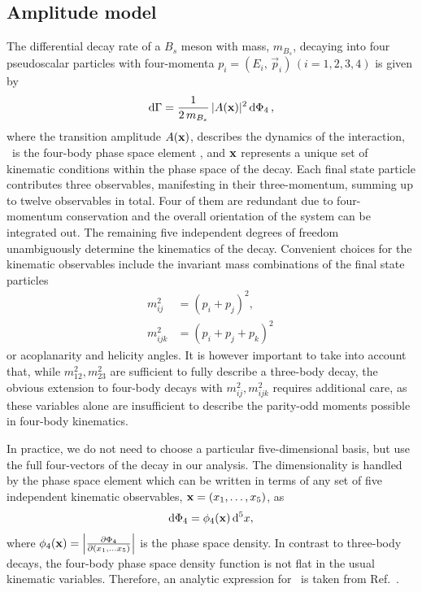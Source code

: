 \clearpage
\subsection{Amplitude model}

The differential decay rate of a $B_s$ meson 
with mass, $m_{B_s}$,
decaying into four pseudoscalar particles with four-momenta $p_{i}= (E_{i},\, \vec p_{i}) \, (i=1,2,3,4)$
is given by
\begin{equation}
	\text{d}\Gamma = \frac{1}{2 \, m_{B_s}} \,  \vert A(\mathbf{x}) \vert^{2} \, \mathrm{d}\Phi_4   \, ,
	\label{eq:decayRate}
\end{equation}
where the transition amplitude $A(\mathbf{x})$, describes the dynamics of the interaction, 
\dphs\ is the four-body phase space element \cite{Peskin}, and 
$\mathbf{x}$ 
represents a unique set of kinematic conditions within the phase space of the decay.
Each final state particle contributes three observables,
manifesting in their three-momentum,
summing up to twelve observables in total.
Four of them are redundant 
due to four-momentum conservation and
the overall orientation of the system can be integrated out.
The remaining  five independent degrees of freedom unambiguously determine the kinematics of the decay.
Convenient choices for the kinematic observables
include the invariant mass combinations of the final state particles
\begin{align}
	\nonumber
	m^{2}_{ij} &= (p_{i}+p_{j})^{2} , \\
	m^{2}_{ijk} &= (p_{i}+p_{j}+p_{k})^{2} \, 
\end{align}
or acoplanarity and helicity angles. %
It is however important
to take into account that, while $m^2_{12}, m^2_{23}$ are sufficient
to fully describe a three-body decay, the obvious extension to
four-body decays with $m^{2}_{ij}, m^{2}_{ijk}$ requires additional
care, as these variables alone are insufficient to describe the parity-odd
moments possible in four-body kinematics.

In practice, we do not need to choose a particular five-dimensional
basis, but use the full four-vectors of the decay in our
analysis. 
The dimensionality is handled by the phase space element which can be written in terms of any set of five independent kinematic observables, $\mathbf{x} = (x_1, \ldots, x_5)$, as
\begin{equation}
	\mathrm{d}\Phi_4 = \phi_4(\mathbf{x}) \, \mathrm{d}^5x ,
\end{equation}
where $\phi_{4}(\mathbf{x} ) = \left\vert  \frac{\partial \Phi_4}{\partial(x_1, \ldots x_5)} \right\vert$ is the phase space density.
In contrast to three-body decays, the four-body phase space density
function is not flat in the usual kinematic variables.  
Therefore, an analytic expression for \phsd\ is
taken from Ref.~\cite{kinematics}.

